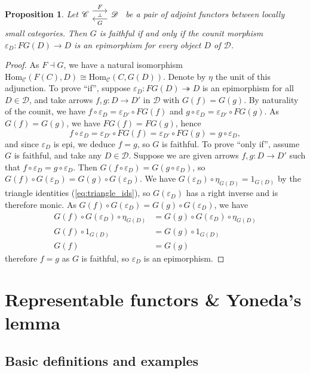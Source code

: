 \documentclass[10pt,oneside]{book}
\def\~#1{\mathscr{#1}}
\newcommand{\Hom}{\mathrm{Hom}}
\newcommand{\epi}{\twoheadrightarrow}
\newcommand{\ve}{\varepsilon}
\theoremstyle{plain}
\newtheorem{prop}[thm]{Proposition}
\theoremstyle{definition}
\theoremstyle{remark}
\numberwithin{equation}{section}
\numberwithin{figure}{section}
\begin{document}
\begin{prop}
Let$\begin{tikzcd}[sep = scriptsize]
    {\~C} & {\~D}
    \arrow[""{name=0, anchor=center, inner sep=0}, "F", shift left=2, from=1-1, to=1-2]
    \arrow[""{name=1, anchor=center, inner sep=0}, "G", shift left=2, from=1-2, to=1-1]
    \arrow["\dashv"{anchor=center, rotate=-90}, draw=none, from=0, to=1]
\end{tikzcd}$ be a pair of adjoint functors between locally small categories. Then $G$ is faithful if and only if the counit morphism $\ve_D: FG(D) \to D$ is an epimorphism for every object $D$ of $\~D$.
\end{prop}
\begin{proof}
    As $F \dashv G$, we have a natural isomorphism $\Hom_{\~C}(F(C), D) \cong \Hom_{\~C}(C, G(D))$. Denote by $\eta$ the unit of this adjunction. To prove ``if'', suppose $\ve_D: FG(D) \epi D$ is an epimorphism for all $D \in \~D$, and take arrows $f,g: D \to D'$ in $\~D$ with $G(f) = G(g)$. By naturality of the counit, we have $f \circ \ve_D = \ve_{D'} \circ FG(f)$ and $g \circ \ve_D = \ve_{D'} \circ FG(g)$. As $G(f) = G(g)$, we have $FG(f) = FG(g)$, hence
    \[f \circ \ve_D = \varepsilon_{D'} \circ FG(f) = \varepsilon_{D'} \circ FG(g) = g \circ \ve_D,\]
    and since $\ve_D$ is epi, we deduce $f = g$, so $G$ is faithful. To prove ``only if'', assume $G$ is faithful, and take any $D \in \~D$. Suppose we are given arrows $f,g: D \to D'$ such that $f \circ \ve_D = g \circ \ve_D$. Then $G(f \circ \ve_D) = G(g \circ \ve_D)$, so $G(f) \circ G(\ve_D) = G(g) \circ G(\ve_D)$. We have $G(\ve_D) \circ \eta_{G(D)} = 1_{G(D)}$ by the triangle identities (\ref{eq:triangle_ids}), so $G(\ve_D)$ has a right inverse and is therefore monic. As $G(f) \circ G(\ve_D) = G(g) \circ G(\ve_D)$, we have 
\begin{align*}G(f) \circ G(\varepsilon_D) \circ \eta_{G(D)} &= G(g) \circ G(\varepsilon_D) \circ \eta_{G(D)}\\G(f) \circ 1_{G(D)} &= G(g) \circ 1_{G(D)}\\G(f) &= G(g)\end{align*}
    therefore $f = g$ as $G$ is faithful, so $\ve_D$ is an epimorphism.
\end{proof}
\chapter{Representable functors \& Yoneda's lemma}

\section{Basic definitions and examples}
\end{document}
